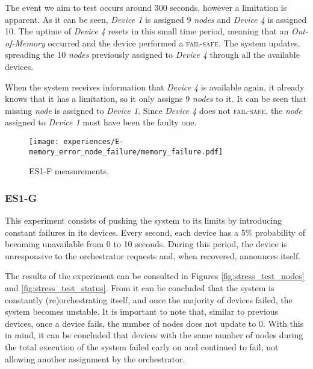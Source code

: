 The event we aim to test occurs around 300 seconds, however a limitation is apparent. As it can be seen, \textit{Device 1} is assigned 9 \textit{nodes} and \textit{Device 4} is assigned 10. The uptime of \textit{Device 4} resets in this small time period, meaning that an \textit{Out-of-Memory} occurred and the device performed a \textsc{fail-safe}. The system updates, spreading the 10 \textit{nodes} previously assigned to \textit{Device 4} through all the available devices. 

When the system receives information that \textit{Device 4} is available again, it already knows that it has a limitation, so it only assigns 9 \textit{nodes} to it. It can be seen that missing \textit{node} is assigned to \textit{Device 1}. Since \textit{Device 4} does not \textsc{fail-safe}, the \textit{node} assigned to \textit{Device 1} must have been the faulty one.

\begin{figure}[h]
\centering
\texttt{[image: experiences/E-memory\_error\_node\_failure/memory\_failure.pdf]}
\caption[ES1-F measurements]{ES1-F measurements.}\label{fig:experiment_e_graph}
\end{figure}


\subsubsection{ES1-G}\label{sec:experiment_f}

This experiment consists of pushing the system to its limits by introducing constant failures in its devices. Every second, each device has a 5\% probability of becoming unavailable from 0 to 10 seconds. During this period, the device is unresponsive to the orchestrator requests and, when recovered, announces itself.

The results of the experiment can be consulted in Figures \ref{fig:stress_test_nodes} and \ref{fig:stress_test_status}. From  it can be concluded that the system is constantly (re)orchestrating itself, and once the majority of devices failed, the system becomes unstable. It is important to note that, similar to previous devices, once a device fails, the number of nodes does not update to 0. With this in mind, it can be concluded that devices with the same number of nodes during the total execution of the system failed early on and continued to fail, not allowing another assignment by the orchestrator.


